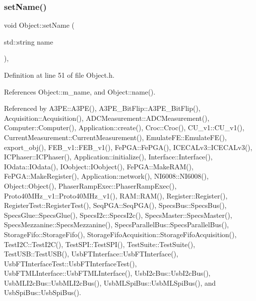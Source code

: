 \subsubsection{\texorpdfstring{set\+Name()}{setName()}}
{\footnotesize\ttfamily void Object\+::set\+Name (\begin{DoxyParamCaption}\item[{std\+::string}]{name }\end{DoxyParamCaption})\hspace{0.3cm}{\ttfamily [inline]}, {\ttfamily [inherited]}}



Definition at line 51 of file Object.\+h.



References Object\+::m\+\_\+name, and Object\+::name().



Referenced by A3\+P\+E\+::\+A3\+P\+E(), A3\+P\+E\+\_\+\+Bit\+Flip\+::\+A3\+P\+E\+\_\+\+Bit\+Flip(), Acquisition\+::\+Acquisition(), A\+D\+C\+Measurement\+::\+A\+D\+C\+Measurement(), Computer\+::\+Computer(), Application\+::create(), Croc\+::\+Croc(), C\+U\+\_\+v1\+::\+C\+U\+\_\+v1(), Current\+Measurement\+::\+Current\+Measurement(), Emulate\+F\+E\+::\+Emulate\+F\+E(), export\+\_\+obj(), F\+E\+B\+\_\+v1\+::\+F\+E\+B\+\_\+v1(), Fe\+P\+G\+A\+::\+Fe\+P\+G\+A(), I\+C\+E\+C\+A\+Lv3\+::\+I\+C\+E\+C\+A\+Lv3(), I\+C\+Phaser\+::\+I\+C\+Phaser(), Application\+::initialize(), Interface\+::\+Interface(), I\+Odata\+::\+I\+Odata(), I\+Oobject\+::\+I\+Oobject(), Fe\+P\+G\+A\+::\+Make\+R\+A\+M(), Fe\+P\+G\+A\+::\+Make\+Register(), Application\+::network(), N\+I6008\+::\+N\+I6008(), Object\+::\+Object(), Phaser\+Ramp\+Exec\+::\+Phaser\+Ramp\+Exec(), Proto40\+M\+Hz\+\_\+v1\+::\+Proto40\+M\+Hz\+\_\+v1(), R\+A\+M\+::\+R\+A\+M(), Register\+::\+Register(), Register\+Test\+::\+Register\+Test(), Seq\+P\+G\+A\+::\+Seq\+P\+G\+A(), Specs\+Bus\+::\+Specs\+Bus(), Specs\+Glue\+::\+Specs\+Glue(), Specs\+I2c\+::\+Specs\+I2c(), Specs\+Master\+::\+Specs\+Master(), Specs\+Mezzanine\+::\+Specs\+Mezzanine(), Specs\+Parallel\+Bus\+::\+Specs\+Parallel\+Bus(), Storage\+Fifo\+::\+Storage\+Fifo(), Storage\+Fifo\+Acquisition\+::\+Storage\+Fifo\+Acquisition(), Test\+I2\+C\+::\+Test\+I2\+C(), Test\+S\+P\+I\+::\+Test\+S\+P\+I(), Test\+Suite\+::\+Test\+Suite(), Test\+U\+S\+B\+::\+Test\+U\+S\+B(), Usb\+F\+T\+Interface\+::\+Usb\+F\+T\+Interface(), Usb\+F\+T\+Interface\+Test\+::\+Usb\+F\+T\+Interface\+Test(), Usb\+F\+T\+M\+L\+Interface\+::\+Usb\+F\+T\+M\+L\+Interface(), Usb\+I2c\+Bus\+::\+Usb\+I2c\+Bus(), Usb\+M\+L\+I2c\+Bus\+::\+Usb\+M\+L\+I2c\+Bus(), Usb\+M\+L\+Spi\+Bus\+::\+Usb\+M\+L\+Spi\+Bus(), and Usb\+Spi\+Bus\+::\+Usb\+Spi\+Bus().


